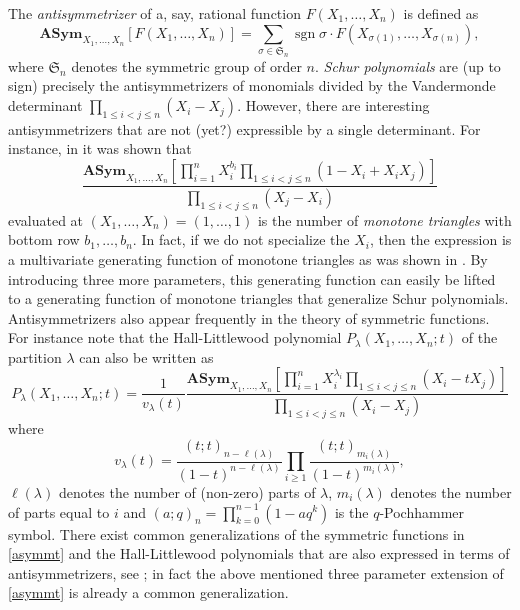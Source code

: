 \documentclass[12pt,dvipsnames]{amsart}
\theoremstyle{definition}
\DeclareMathOperator{\sgn}{sgn}
\newcommand{\asym}{\mathbf{ASym}}
\begin{document}
The \emph{antisymmetrizer} of a, say, rational function $F(X_1,\ldots,X_n)$ is defined as 
$$
\asym_{X_1,\ldots,X_n} \left[ F(X_1,\ldots,X_n) \right] = \sum_{\sigma \in \mathfrak{S}_n} \sgn \sigma \cdot F(X_{\sigma(1)},\ldots,X_{\sigma(n)}),
$$
where $ \mathfrak{S}_n$ denotes the symmetric group of order $n$.
\emph{Schur polynomials} are (up to sign) precisely the antisymmetrizers of monomials divided by the Vandermonde determinant 
$\prod_{1 \le i < j \le n}(X_i-X_j)$. However, there are interesting antisymmetrizers that are not (yet?) expressible by a single determinant. For instance, in \cite[(2.8)]{gog} it was shown that 
\begin{equation}
\label{asymmt}
\frac{\asym_{X_1,\ldots,X_n} \left[  
\prod\limits_{i=1}^n X_i^{b_i}  
\prod\limits_{1 \le i < j \le n} (1-X_i + X_i X_j) \right]}{\prod\limits_{1 \le i < j \le n} (X_j-X_i)}
\end{equation} 
evaluated at $(X_1,\ldots,X_n)=(1,\ldots,1)$ is the number of \emph{monotone triangles} with bottom row $b_1,\ldots,b_n$.
In fact, if we do not specialize the $X_i$, then the 
expression is a multivariate generating function of monotone triangles as was shown in \cite{FS23}. By introducing 
three more parameters, this generating function can easily be lifted to a generating function of monotone triangles that generalize Schur polynomials. Antisymmetrizers also appear frequently in 
the theory of symmetric functions. For instance note that the Hall-Littlewood polynomial
$P_{\lambda}(X_1,\ldots,X_n;t)$ of the partition $\lambda$ can also be written as 
$$
P_{\lambda}(X_1,\ldots,X_n;t) = \frac{1}{v_{\lambda}(t)} 
\frac{\asym_{X_1,\ldots,X_n} \left[ \prod_{i=1}^n X_i^{\lambda_i} \prod_{1 \le i < j \le n} (X_i- t X_j)\right]}{\prod_{1 \le i < j \le n} (X_i-X_j)}
$$ 
where 
$$
v_{\lambda}(t) = \frac{(t;t)_{n-\ell(\lambda)}}{(1-t)^{n-\ell(\lambda)}}
\prod_{i \ge 1} \frac{(t;t)_{m_i(\lambda)}}{(1-t)^{m_i(\lambda)}},
$$
$\ell(\lambda)$ denotes the number of (non-zero) parts of $\lambda$, $m_i(\lambda)$ denotes 
the number of parts equal to $i$ and $(a;q)_n= \prod_{k=0}^{n-1} (1- a q^k)$ is the $q$-Pochhammer symbol. There exist common generalizations of the symmetric functions in \eqref{asymmt} and the Hall-Littlewood polynomials that are also expressed in terms of 
antisymmetrizers, see \cite{FG26}; in fact the above mentioned three parameter extension of \eqref{asymmt} is already a common generalization.

\bigskip
\end{document}
